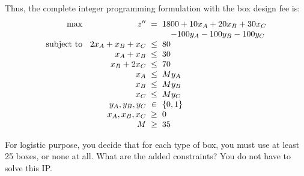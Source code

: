 \documentclass[a4paper, 10pt]{article}
\begin{document}
\begin{solution}
\vspace{4mm}

Thus, the complete integer programming formulation with the box design fee is:
\[
\begin{array}{@{\hspace{2mm}} r @{\hspace{2mm}} r @{\hspace{2mm}} c @{\hspace{2mm}} l}
    \text{max } & z'' & = & 1800 + 10x_A + 20x_B + 30x_C \\
    & & & \quad - 100y_A - 100y_B - 100y_C \\
    \text{subject to } & 2x_A + x_B + x_C & \leq & 80 \\
    & x_A + x_B & \leq & 30 \\
    & x_B + 2x_C & \leq & 70 \\
    & x_A & \leq & M y_A \\
    & x_B & \leq & M y_B \\
    & x_C & \leq & M y_C \\
    & y_A, y_B, y_C & \in & \set{ 0, 1 } \\
    & x_A, x_B, x_C & \geq & 0 \\
    & M & \geq & 35 \\
\end{array}
\]
\end{solution}

\newpage

\begin{subproblems_alpha}[start=4]
    \item For logistic purpose, you decide that for each type of box, you must use at least 25 boxes, or none at all.
    What are the added constraints?
    You do not have to solve this IP.
\end{subproblems_alpha}
\end{document}
